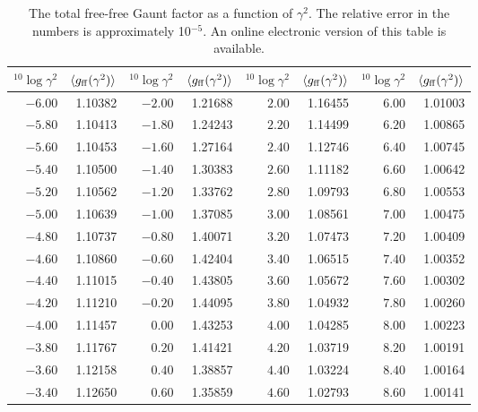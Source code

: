 \documentclass[useAMS,usenatbib]{mn2e}
\begin{document}
\begin{table}
\caption{The total free-free Gaunt factor as a function of $\gamma^2$. The
  relative error in the numbers is approximately 10$^{-5}$. An online
  electronic version of this table is available.\label{fravgff:tab}}
\begin{tabular}{rr@{\hspace*{12mm}}rr@{\hspace*{12mm}}rr@{\hspace*{12mm}}rr}
\hline
${}^{10}\log\gamma^2$ & $\langle g_{\rm ff}(\gamma^2)\rangle$ & ${}^{10}\log\gamma^2$ & $\langle g_{\rm ff}(\gamma^2)\rangle$ & ${}^{10}\log\gamma^2$ & $\langle g_{\rm ff}(\gamma^2)\rangle$ & ${}^{10}\log\gamma^2$ & $\langle g_{\rm ff}(\gamma^2)\rangle$ \\
\hline
  $-6.00$ & 1.10382 &   $-2.00$ & 1.21688 &   $ 2.00$ & 1.16455 &   $ 6.00$ & 1.01003 \\
  $-5.80$ & 1.10413 &   $-1.80$ & 1.24243 &   $ 2.20$ & 1.14499 &   $ 6.20$ & 1.00865 \\
  $-5.60$ & 1.10453 &   $-1.60$ & 1.27164 &   $ 2.40$ & 1.12746 &   $ 6.40$ & 1.00745 \\
  $-5.40$ & 1.10500 &   $-1.40$ & 1.30383 &   $ 2.60$ & 1.11182 &   $ 6.60$ & 1.00642 \\
  $-5.20$ & 1.10562 &   $-1.20$ & 1.33762 &   $ 2.80$ & 1.09793 &   $ 6.80$ & 1.00553 \\
  $-5.00$ & 1.10639 &   $-1.00$ & 1.37085 &   $ 3.00$ & 1.08561 &   $ 7.00$ & 1.00475 \\
  $-4.80$ & 1.10737 &   $-0.80$ & 1.40071 &   $ 3.20$ & 1.07473 &   $ 7.20$ & 1.00409 \\
  $-4.60$ & 1.10860 &   $-0.60$ & 1.42404 &   $ 3.40$ & 1.06515 &   $ 7.40$ & 1.00352 \\
  $-4.40$ & 1.11015 &   $-0.40$ & 1.43805 &   $ 3.60$ & 1.05672 &   $ 7.60$ & 1.00302 \\
  $-4.20$ & 1.11210 &   $-0.20$ & 1.44095 &   $ 3.80$ & 1.04932 &   $ 7.80$ & 1.00260 \\
  $-4.00$ & 1.11457 &   $ 0.00$ & 1.43253 &   $ 4.00$ & 1.04285 &   $ 8.00$ & 1.00223 \\
  $-3.80$ & 1.11767 &   $ 0.20$ & 1.41421 &   $ 4.20$ & 1.03719 &   $ 8.20$ & 1.00191 \\
  $-3.60$ & 1.12158 &   $ 0.40$ & 1.38857 &   $ 4.40$ & 1.03224 &   $ 8.40$ & 1.00164 \\
  $-3.40$ & 1.12650 &   $ 0.60$ & 1.35859 &   $ 4.60$ & 1.02793 &   $ 8.60$ & 1.00141 \\

\end{tabular}
\end{table}
\end{document}

